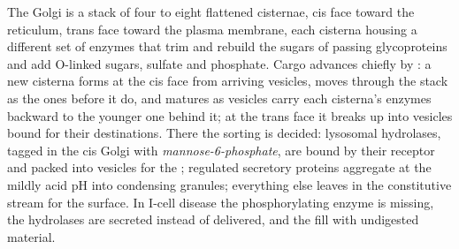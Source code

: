 \begin{proposition}\label{prop:b3:membrane-traffic:golgi}
The Golgi is a stack of four to eight flattened cisternae, cis face
toward the reticulum, trans face toward the plasma membrane, each
cisterna housing a different set of enzymes that trim and rebuild the
sugars of passing glycoproteins and add O-linked sugars, sulfate and
phosphate. Cargo advances chiefly by \emph{}: a new
cisterna forms at the cis face from arriving vesicles, moves through
the stack as the ones before it do, and matures as  vesicles carry
each cisterna's enzymes backward to the younger one behind it; at the
trans face it breaks up into vesicles bound for their destinations.
There the sorting is decided: lysosomal hydrolases, tagged in the cis
Golgi with \emph{mannose-6-phosphate}, are bound by their receptor and
packed into  vesicles for the ; regulated secretory
proteins aggregate at the mildly acid pH into condensing granules;
everything else leaves in the constitutive stream for the surface. In
I-cell disease the phosphorylating enzyme is missing, the hydrolases
are secreted instead of delivered, and the  fill with
undigested material.
\end{proposition}

